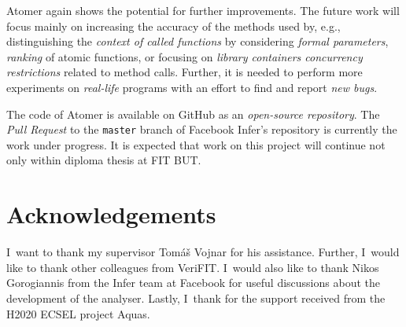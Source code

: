 Atomer again shows the potential for further improvements. The future work
will focus mainly on increasing the accuracy of the methods used by, e.g.,
distinguishing the \emph{context of called functions} by considering
\emph{formal parameters}, \emph{ranking} of atomic functions, or focusing on
\emph{library containers concurrency restrictions} related to method calls.
Further, it is needed to perform more experiments on \emph{real-life}
programs with an effort to find and report \emph{new bugs}.

The code of Atomer is available on GitHub as an \emph{open-source repository}.
The \emph{Pull Request} to the \texttt{master} branch of Facebook Infer's
repository is currently the work under progress. It is expected that work
on this project will continue not only within diploma thesis at FIT BUT.


\section*{Acknowledgements}
I~want to thank my supervisor Tomáš Vojnar for his assistance. Further,
I~would like to thank other colleagues from VeriFIT. I~would also like
to thank Nikos Gorogiannis from the Infer team at Facebook for useful
discussions about the development of the analyser. Lastly, I~thank for the
support received from the H2020 ECSEL project Aquas.
